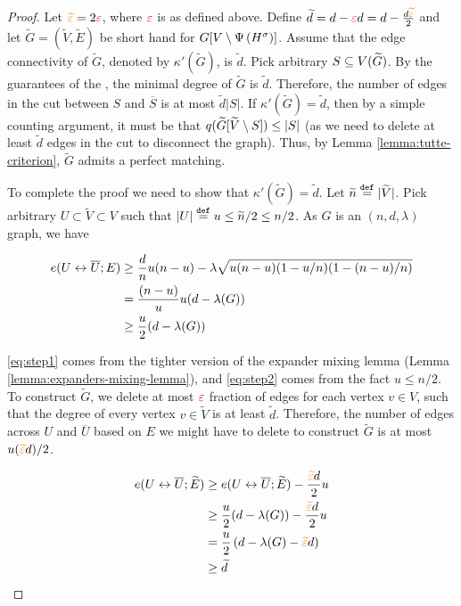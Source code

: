\documentclass[11pt]{article}
\newcommand{\Complement}[1]{\overline{#1}}
\newcommand{\EdgeConnectivity}[1]{\kappa'(#1)}
\newcommand{\EnDeeLambda}{(n, d, \lambda)}
\newcommand{\Subdivision}[2]{{#1}^{#2}}
\newcommand{\ExpansionFactor}[1]{\lambda(#1)}
\begin{document}
\begin{proof}
Let $\textcolor{orange}{\widetilde{\varepsilon}} = 2\textcolor{red}{\varepsilon}$, where $\textcolor{red}{\varepsilon}$ is as defined above.
Define $\widetilde{d} = d - \textcolor{red}{\varepsilon} d =d - \frac{d\textcolor{orange}{\widetilde{\varepsilon}}}{2}$ and let $\tilde{G}=(\tilde{V}, \tilde{E})$ be short hand for $\Graph[V \setminus \Embedding{\Subdivision{H}{\sigma}}]$.
Assume that the edge connectivity of $\tilde{G}$, denoted by $\EdgeConnectivity{\tilde{G}}$, is $\tilde{d}$. 
Pick arbitrary $S \subseteq V(\widetilde{G})$.
By the guarantees of the  , 
the minimal degree of $\tilde{G}$ is $\tilde{d}$. 
Therefore, the number of edges in the cut between $S$ and $\Complement{S}$ is at most $\tilde{d}|S|$.
If $\EdgeConnectivity{\tilde{G}} = \tilde{d}$, then by a simple counting argument, it must be that $q(\widetilde{G}[\widetilde{V} \setminus S]) \leq |S|$ (as we need to delete  at least $\tilde{d}$ edges in the cut to disconnect the graph).
Thus, by Lemma \ref{lemma:tutte-criterion}, $\tilde{G}$ admits a perfect matching.

To complete the proof we need to show that $\EdgeConnectivity{\tilde{G}} = \tilde{d}$.
Let $\widetilde{n} \text{}\overset{\mathtt{def}}{=} |\widetilde{V}|$.
Pick arbitrary $U \subset \tilde{V} \subset V$ such that $|U| \text{}\overset{\mathtt{def}}{=} u \leq \widetilde{n}/2 \leq n/2$.
As $G$ is an $\EnDeeLambda$ graph, we have

\begin{align}
\CutEdges{U}{\Complement{U}}{E} &\geq 	\frac{d}{n}u(n-u) - \lambda\sqrt{u(n-u)(1 - u/n)(1- (n-u)/n)} \label{eq:step1}\\
&= \frac{(n-u)}{u}u(d - \ExpansionFactor{G}) \label{eq:step2}\\
&\geq \frac{u}{2}(d - \ExpansionFactor{G})
\end{align}

\eqref{eq:step1} comes from the tighter version of the expander mixing lemma (Lemma \ref{lemma:expanders-mixing-lemma}), and 
\eqref{eq:step2} comes from the fact $u \leq n/2$.
To construct $\tilde{G}$, we delete at most $\textcolor{red}{\varepsilon}$ fraction of edges for each vertex $v \in V$, such that the degree of every vertex $v \in \tilde{V}$ is at least $\tilde{d}$.
Therefore, the number of edges across $U$ and $\Complement{U}$ based on $E$ we might have to delete to construct $\tilde{G}$ is at most $u(\textcolor{orange}{\widetilde{\varepsilon}} d)/2$.

\begin{align}
	\CutEdges{U}{\Complement{U}}{\tilde{E}} &\geq 	\CutEdges{U}{\Complement{U}}{\tilde{E}} - \frac{\PartitionEps d}{2} u \\
&\geq \frac{u}{2}(d - \ExpansionFactor{G}) - \frac{\PartitionEps d}{2} u \\
&= \frac{u}{2}\left(d - \ExpansionFactor{G} - \PartitionEps d\right) \label{eq:lambda-assumption} \\
&\geq \tilde{d}
\end{align}



\end{proof}
\end{document}

